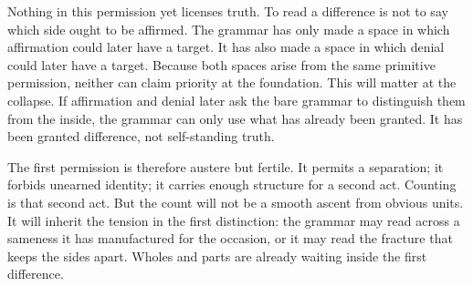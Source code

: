 Nothing in this permission yet licenses truth. To read a difference is
not to say which side ought to be affirmed. The grammar has only made a
space in which affirmation could later have a target. It has also made a
space in which denial could later have a target. Because both spaces
arise from the same primitive permission, neither can claim priority at
the foundation. This will matter at the collapse. If affirmation and
denial later ask the bare grammar to distinguish them from the inside,
the grammar can only use what has already been granted. It has been
granted difference, not self-standing truth.

The first permission is therefore austere but fertile. It permits a
separation; it forbids unearned identity; it carries enough structure for
a second act. Counting is that second act. But the count will not be a
smooth ascent from obvious units. It will inherit the tension in the
first distinction: the grammar may read across a sameness it has
manufactured for the occasion, or it may read the fracture that keeps the
sides apart. Wholes and parts are already waiting inside the first
difference.
